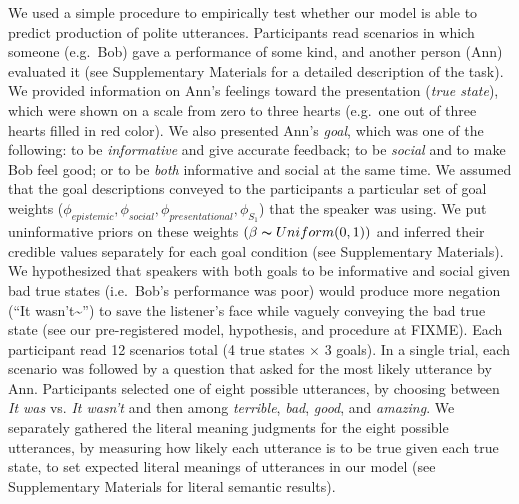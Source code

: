 \documentclass[12pt]{article}
\begin{document}

We used a simple procedure to empirically test whether our model is able to predict production of polite utterances. 
Participants read scenarios in which someone (e.g.~Bob) gave a performance of some kind, 
and another person (Ann) evaluated it (see Supplementary Materials for a detailed description of the task). 
We provided information on Ann's feelings toward the presentation (\emph{true state}), 
which were shown on a scale from zero to three hearts 
(e.g.~one out of three hearts filled in red color). 
We also presented Ann's \emph{goal}, which was one of the following: 
to be \emph{informative} and give accurate feedback; 
to be \emph{social} and to make Bob feel good; 
or to be \emph{both} informative and social at the same time. 
We assumed that the goal descriptions conveyed to the participants a particular set of goal weights (\(\phi_{epistemic}, \phi_{social}, \phi_{presentational}, \phi_{S_1}\)) that the speaker was using. We put uninformative priors on these weights \((\beta \thicksim Uniform(0,1))\) and inferred their credible values separately for each goal condition (see Supplementary Materials).
We hypothesized that speakers with both goals to be informative and social given bad true states (i.e.~Bob's performance was poor) would produce more negation (\enquote{It wasn't\textasciitilde{}}) to save the listener's face while vaguely conveying the bad true state 
(see our pre-registered model, hypothesis, and procedure at FIXME). 
Each participant read 12 scenarios total (4 true states \(\times\) 3 goals).
In a single trial, each scenario was followed by a question that asked for the most likely utterance by Ann. 
Participants selected one of eight possible utterances, by choosing between \emph{It was} vs. \emph{It wasn't} and then among \emph{terrible}, \emph{bad}, \emph{good}, and \emph{amazing}. 
We separately gathered the literal meaning judgments for the eight possible utterances, 
by measuring how likely each utterance is to be true given each true state, to set expected
literal meanings of utterances in our model 
(see Supplementary Materials for literal semantic results).

\end{document}
